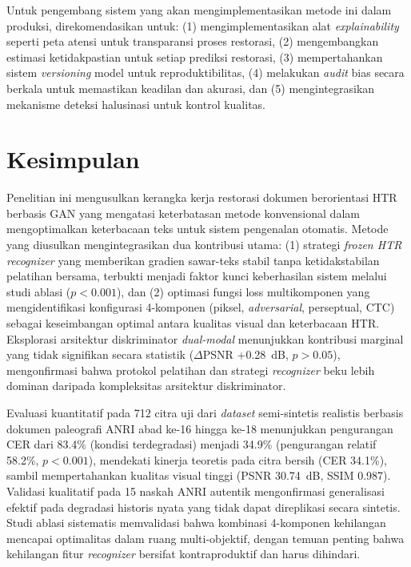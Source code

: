 \documentclass[journal]{IEEEtran}
\begin{document}
Untuk pengembang sistem yang akan mengimplementasikan metode ini dalam produksi, direkomendasikan untuk: (1) mengimplementasikan alat \textit{explainability} seperti peta atensi untuk transparansi proses restorasi, (2) mengembangkan estimasi ketidakpastian untuk setiap prediksi restorasi, (3) mempertahankan sistem \textit{versioning} model untuk reproduktibilitas, (4) melakukan \textit{audit} bias secara berkala untuk memastikan keadilan dan akurasi, dan (5) mengintegrasikan mekanisme deteksi halusinasi untuk kontrol kualitas.

\section{Kesimpulan}

Penelitian ini mengusulkan kerangka kerja restorasi dokumen berorientasi HTR berbasis GAN yang mengatasi keterbatasan metode konvensional dalam mengoptimalkan keterbacaan teks untuk sistem pengenalan otomatis. Metode yang diusulkan mengintegrasikan dua kontribusi utama: (1) strategi \textit{frozen HTR recognizer} yang memberikan gradien sawar-teks stabil tanpa ketidakstabilan pelatihan bersama, terbukti menjadi faktor kunci keberhasilan sistem melalui studi ablasi ($p<0.001$), dan (2) optimasi fungsi loss multikomponen yang mengidentifikasi konfigurasi 4-komponen (piksel, \textit{adversarial}, perseptual, CTC) sebagai keseimbangan optimal antara kualitas visual dan keterbacaan HTR. Eksplorasi arsitektur diskriminator \textit{dual-modal} menunjukkan kontribusi marginal yang tidak signifikan secara statistik ($\Delta$PSNR +0.28~dB, $p>0.05$), mengonfirmasi bahwa protokol pelatihan dan strategi \textit{recognizer} beku lebih dominan daripada kompleksitas arsitektur diskriminator.

Evaluasi kuantitatif pada 712 citra uji dari \textit{dataset} semi-sintetis realistis berbasis dokumen paleografi ANRI abad ke-16 hingga ke-18 menunjukkan pengurangan CER dari 83.4\% (kondisi terdegradasi) menjadi 34.9\% (pengurangan relatif 58.2\%, $p<0.001$), mendekati kinerja teoretis pada citra bersih (CER 34.1\%), sambil mempertahankan kualitas visual tinggi (PSNR 30.74~dB, SSIM 0.987). Validasi kualitatif pada 15 naskah ANRI autentik mengonfirmasi generalisasi efektif pada degradasi historis nyata yang tidak dapat direplikasi secara sintetis. Studi ablasi sistematis memvalidasi bahwa kombinasi 4-komponen kehilangan mencapai optimalitas dalam ruang multi-objektif, dengan temuan penting bahwa kehilangan fitur \textit{recognizer} bersifat kontraproduktif dan harus dihindari.
\end{document}
